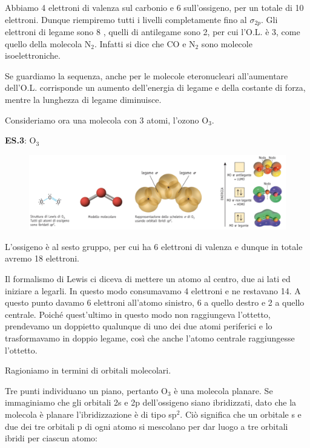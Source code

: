 Abbiamo 4 elettroni di valenza sul carbonio e 6 sull'ossigeno, per un totale di 10 elettroni. Dunque riempiremo tutti i livelli completamente fino al $\sigma_{2p}$. Gli elettroni di legame sono 8 , quelli di antilegame sono 2, per cui l'O.L. è 3, come quello della molecola N$_2$. Infatti si dice che CO e N$_2$ sono molecole isoelettroniche.

Se guardiamo la sequenza, anche per le molecole eteronucleari all'aumentare dell'O.L. corrisponde un aumento dell'energia di legame e della costante di forza, mentre la lunghezza di legame diminuisce.

\vspace{0.2cm}Consideriamo ora una molecola con 3 atomi, l'ozono O$_3$.

\vspace{0.2cm}\textbf{ES.3}: O$_3$

\begin{figure}[H]
    \centering
    \includegraphics[width=14cm]{immagini/orbitali_molecolari_O_3.png}
\end{figure}

L'ossigeno è al sesto gruppo, per cui ha 6 elettroni di valenza e dunque in totale avremo 18 elettroni.

Il formalismo di Lewis ci diceva di mettere un atomo al centro, due ai lati ed iniziare a legarli. In questo modo consumavamo 4 elettroni e ne restavano 14. A questo punto davamo 6 elettroni all'atomo sinistro, 6 a quello destro e 2 a quello centrale. Poiché quest'ultimo in questo modo non raggiungeva l'ottetto, prendevamo un doppietto qualunque di uno dei due atomi periferici e lo trasformavamo in doppio legame, così che anche l'atomo centrale raggiungesse l'ottetto.

Ragioniamo in termini di orbitali molecolari.

Tre punti individuano un piano, pertanto O$_3$ è una molecola planare. Se immaginiamo che gli orbitali 2s e 2p dell'ossigeno siano ibridizzati, dato che la molecola è planare l'ibridizzazione è di tipo sp$^2$. Ciò significa che un orbitale s e due dei tre orbitali p di ogni atomo si mescolano per dar luogo a tre orbitali ibridi per ciascun atomo:

